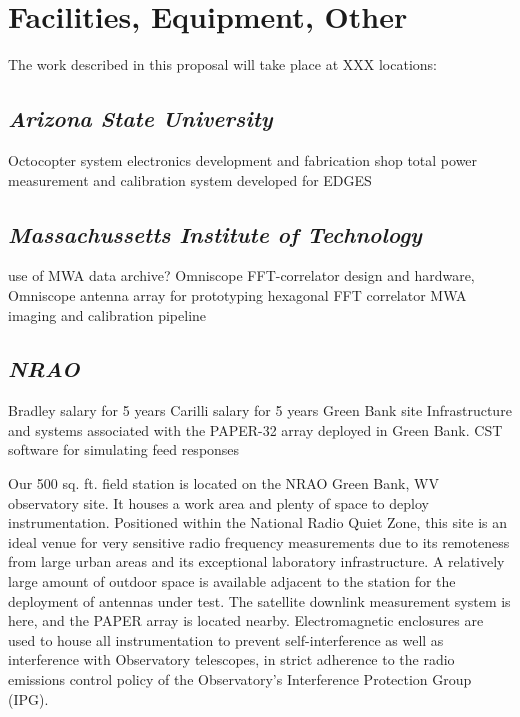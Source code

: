 \documentclass[11pt]{article}
\begin{document}
\pagestyle{empty}

\section*{Facilities, Equipment, Other}

The work described in this proposal will take place at XXX locations: 

\subsection*{\it Arizona State University}

Octocopter system
electronics development and fabrication shop
total power measurement and calibration system developed for EDGES

\subsection*{\it Massachussetts Institute of Technology}

use of MWA data archive?
Omniscope FFT-correlator design and hardware,
Omniscope antenna array for prototyping hexagonal FFT correlator
MWA imaging and calibration pipeline

\subsection*{\it NRAO} 

Bradley salary for 5 years
Carilli salary for 5 years
Green Bank site
Infrastructure and systems associated with the PAPER-32 array deployed in Green Bank.
CST software for simulating feed responses


Our 500 sq. ft. field station is located on the NRAO Green Bank, WV observatory
site. It houses a work area and plenty of space to deploy instrumentation.
Positioned within the National Radio Quiet Zone, this site is an ideal venue
for very sensitive radio frequency measurements due to its remoteness from
large urban areas and its exceptional laboratory infrastructure. A relatively
large amount of outdoor space is available adjacent to the station for the
deployment of antennas under test. The satellite downlink measurement system is
here, and the PAPER array is located nearby. Electromagnetic enclosures are
used to house all instrumentation to prevent self-interference as well as
interference with Observatory telescopes, in strict adherence to the radio
emissions control policy of the Observatory’s Interference Protection Group
(IPG).
\end{document}

